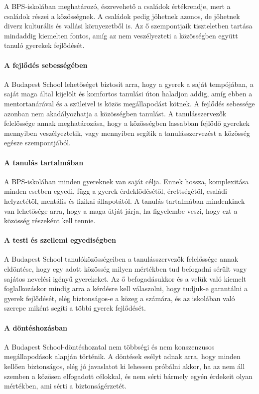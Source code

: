 A BPS-iskolában meghatározó, észrevehető a családok értékrendje, mert a
családok részei a közösségnek. A családok pedig jöhetnek azonos, de
jöhetnek diverz kulturális és vallási környezetből is. Az ő szempontjaik
tiszteletben tartása mindaddig kiemelten fontos, amíg az nem
veszélyezteti a közösségben együtt tanuló gyerekek fejlődését.

\hypertarget{a-fejlodes-sebessegeben}{%
\paragraph{A fejlődés sebességében}\label{a-fejlodes-sebessegeben}}

A Budapest School lehetőséget biztosít arra, hogy a gyerek a saját
tempójában, a saját maga által kijelölt és komfortos tanulási úton
haladjon addig, amíg ebben a mentortanárával és a szüleivel is közös
megállapodást kötnek. A fejlődés sebessége azonban nem akadályozhatja a
közösségben tanulást. A tanulásszervezők felelőssége annak
meghatározása, hogy a közösségben lassabban fejlődő gyerekek
mennyiben veszélyeztetik, vagy mennyiben segítik a tanulásszervezést a
közösség egésze szempontjából.

\hypertarget{a-tanulas-tartalmaban}{%
\paragraph{A tanulás tartalmában}\label{a-tanulas-tartalmaban}}

A BPS-iskolában minden gyereknek van saját\break
célja. Ennek hossza,
komplexitása minden esetben egyedi, függ a gyerek érdeklődésétől,
érettségétől, családi helyzetétől, mentális és fizikai állapotától. A
tanulás tartalmában mindenkinek van lehetősége arra, hogy a maga útját
járja, ha figyelembe veszi, hogy ezt a közösség részeként kell tennie.

\hypertarget{a-testi-es-szellemi-egyedisegben}{%
\paragraph{A testi és szellemi
egyediségben}\label{a-testi-es-szellemi-egyedisegben}}

A Budapest School tanulóközösségeiben a tanulásszervezők felelőssége
annak eldöntése, hogy egy adott közösség milyen mértékben tud befogadni
sérült vagy sajátos nevelési igényű gyerekeket. Az ő befogadásukkor és a
velük való kiemelt foglalkozáskor mindig arra a kérdésre kell
válaszolni, hogy tudjuk-e garantálni a gyerek fejlődését, elég
biztonságos-e a közeg a számára, és az iskolában való szerepe miként
segíti a többi gyerek fejlődését.

\hypertarget{a-donteshozasban}{%
\paragraph{A döntéshozásban}\label{a-donteshozasban}}

A Budapest School-döntéshozatal nem többségi és nem konszenzusos
megállapodások alapján történik. A döntések esélyt adnak arra, hogy
minden kellően biztonságos, elég jó javaslatot ki lehessen próbálni
akkor, ha az nem áll szemben a közösen elfogadott célokkal, és nem sérti
bármely egyén érdekeit olyan mértékben, ami sérti a biztonságérzetét.
